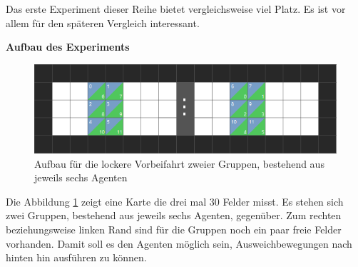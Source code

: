 Das erste Experiment dieser Reihe bietet vergleichsweise viel Platz. Es ist vor allem für den späteren Vergleich interessant.

\textbf{Aufbau des Experiments}
\begin{figure}[H]
    \includegraphics[width=\textwidth]{images/6vs6_spacy.png}
    \centering
    \caption{Aufbau für die lockere Vorbeifahrt zweier Gruppen, bestehend aus jeweils sechs Agenten}
    \label{fig:6x6Locker}
\end{figure}
 Die Abbildung \ref{fig:6x6Locker} zeigt eine Karte die drei mal 30 Felder misst. Es stehen sich zwei Gruppen, bestehend aus jeweils sechs Agenten, gegenüber. Zum rechten beziehungsweise linken Rand sind für die Gruppen noch ein paar freie Felder vorhanden. Damit soll es den Agenten möglich sein, Ausweichbewegungen nach hinten hin ausführen zu können.